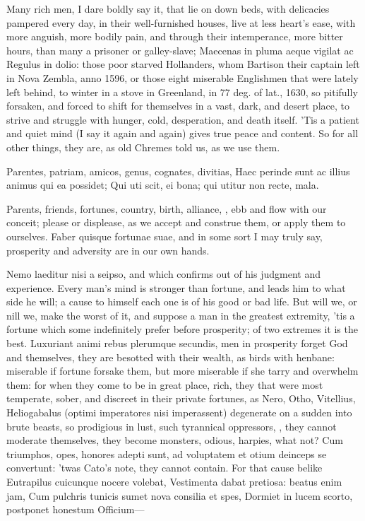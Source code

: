 {Many rich men, I dare boldly say it, that lie on down beds, with
delicacies pampered every day, in their well-furnished houses, live at
less heart's ease, with more anguish, more bodily pain, and through
their intemperance, more bitter hours, than many a prisoner or
galley-slave; Maecenas in pluma aeque vigilat ac Regulus in
dolio: those poor starved Hollanders, whom Bartison their captain
left in Nova Zembla, anno 1596, or those eight miserable
Englishmen that were lately left behind, to winter in a stove in
Greenland, in 77 deg. of lat., 1630, so pitifully forsaken, and forced
to shift for themselves in a vast, dark, and desert place, to strive
and struggle with hunger, cold, desperation, and death itself. 'Tis a
patient and quiet mind (I say it again and again) gives true peace and
content. So for all other things, they are, as old Chremes told
us, as we use them.

Parentes, patriam, amicos, genus, cognates, divitias,
Haec perinde sunt ac illius animus qui ea possidet;
Qui uti scit, ei bona; qui utitur non recte, mala.

Parents, friends, fortunes, country, birth, alliance, \etc{}, ebb and flow
with our conceit; please or displease, as we accept and construe them,
or apply them to ourselves. Faber quisque fortunae suae, and in some
sort I may truly say, prosperity and adversity are in our own hands.

Nemo laeditur nisi a seipso, and which \Seneca confirms out of his
judgment and experience. Every man's mind is stronger than
fortune, and leads him to what side he will; a cause to himself each
one is of his good or bad life. But will we, or nill we, make the worst
of it, and suppose a man in the greatest extremity, 'tis a fortune
which some indefinitely prefer before prosperity; of two extremes it is
the best. Luxuriant animi rebus plerumque secundis, men in
prosperity forget God and themselves, they are besotted with
their wealth, as birds with henbane:  miserable if fortune
forsake them, but more miserable if she tarry and overwhelm them: for
when they come to be in great place, rich, they that were most
temperate, sober, and discreet in their private fortunes, as Nero,
Otho, Vitellius, Heliogabalus (optimi imperatores nisi imperassent)
degenerate on a sudden into brute beasts, so prodigious in lust, such
tyrannical oppressors, \etc{}, they cannot moderate themselves, they
become monsters, odious, harpies, what not? Cum triumphos, opes,
honores adepti sunt, ad voluptatem et otium deinceps se convertunt:
'twas Cato's note, they cannot contain. For that cause belike
Eutrapilus cuicunque nocere volebat,
Vestimenta dabat pretiosa: beatus enim jam,
Cum pulchris tunicis sumet nova consilia et spes,
Dormiet in lucem scorto, postponet honestum
Officium---

}
